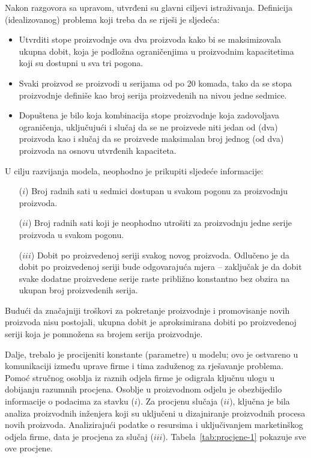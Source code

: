 \documentclass[a4paper, utf8, 11pt, colorlinks]{book}
\theoremstyle{definition}
\begin{document}
Nakon razgovora sa upravom, utvrđeni su glavni ciljevi istraživanja. Definicija  (idealizovanog) problema koji treba da se riješi je sljedeća:
\begin{itemize}
    \item Utvrditi  stope proizvodnje  ova dva proizvoda kako bi se maksimizovala ukupna dobit, koja je podložna ograničenjima u  proizvodnim kapacitetima koji su dostupni u sva tri pogona. 
    \item Svaki proizvod se proizvodi u serijama od po 20 komada, tako da se stopa proizvodnje definiše kao broj serija proizvedenih na nivou jedne sedmice. 
    \item Dopuštena je bilo koja kombinacija stope proizvodnje koja zadovoljava ograničenja, uključujući i slučaj da se ne proizvede niti jedan od (dva) proizvoda kao i slučaj da se proizvede maksimalan broj jednog (od dva) proizvoda na osnovu utvrđenih kapaciteta.
\end{itemize}

U cilju razvijanja modela, neophodno je prikupiti sljedeće informacije:
\begin{itemize}
	\item[($i$)]   Broj radnih sati u sedmici dostupan u svakom pogonu za proizvodnju proizvoda.  
	\item[($ii$)]   Broj radnih sati koji je neophodno utrošiti  za proizvodnju jedne serije proizvoda u svakom pogonu.
	\item[($iii$)] Dobit po proizvedenoj seriji svakog novog proizvoda. Odlučeno je da dobit po proizvedenoj seriji bude   odgovarajuća mjera -- zaključak je da dobit svake dodatne proizvedene serije  raste približno konstantno bez obzira na ukupan broj proizvedenih serija.
\end{itemize} 

Budući da značajniji troškovi za pokretanje proizvodnje i promovisanje novih proizvoda nisu postojali, ukupna dobit je aproksimirana dobiti po proizvedenoj seriji koja je pomnožena sa brojem serija proizvodnje.  

Dalje, trebalo je procijeniti konstante (parametre)  u modelu; ovo je ostvareno u komunikaciji između uprave firme i tima zaduženog za rješavanje problema. Pomoć stručnog osoblja iz raznih odjela firme je odigrala ključnu ulogu u dobijanju razumnih procjena.
 Osoblje u proizvodnom odjelu   je obezbijedilo informacije o podacima za stavku ($i$). Za procjenu slučaja ($ii$), ključna je bila analiza proizvodnih inženjera koji su uključeni u dizajniranje proizvodnih procesa novih proizvoda. Analizirajući podatke o resursima i uključivanjem  marketinškog odjela firme,  data je procjena za slučaj ($iii$). Tabela~\ref{tab:procjene-1} pokazuje sve ove procjene. 
\end{document}
